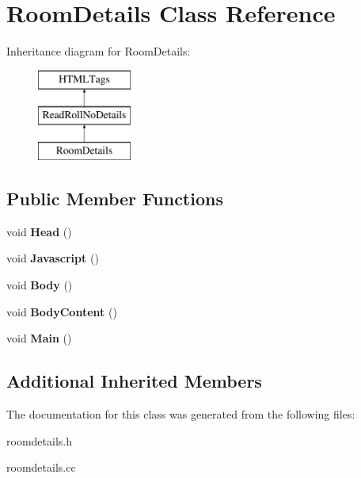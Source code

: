 \hypertarget{classRoomDetails}{\section{Room\-Details Class Reference}
\label{classRoomDetails}
}
Inheritance diagram for Room\-Details\-:\begin{figure}[H]
\begin{center}
\leavevmode
\includegraphics[height=3.000000cm]{classRoomDetails}
\end{center}
\end{figure}
\subsection*{Public Member Functions}
\begin{DoxyCompactItemize}
\item 
\hypertarget{classRoomDetails_a12c87132fd36826fe2af9dbdb0b78e95}{void {\bfseries Head} ()}\label{classRoomDetails_a12c87132fd36826fe2af9dbdb0b78e95}

\item 
\hypertarget{classRoomDetails_aa88baea324517582b52f0e414744ea5d}{void {\bfseries Javascript} ()}\label{classRoomDetails_aa88baea324517582b52f0e414744ea5d}

\item 
\hypertarget{classRoomDetails_ad75c50cee05130e464714649ad640fa5}{void {\bfseries Body} ()}\label{classRoomDetails_ad75c50cee05130e464714649ad640fa5}

\item 
\hypertarget{classRoomDetails_ab440cfe52056a93720c2f6d82622510f}{void {\bfseries Body\-Content} ()}\label{classRoomDetails_ab440cfe52056a93720c2f6d82622510f}

\item 
\hypertarget{classRoomDetails_a5d3f194992c2c13c77d0d07e7d7d5bcd}{void {\bfseries Main} ()}\label{classRoomDetails_a5d3f194992c2c13c77d0d07e7d7d5bcd}

\end{DoxyCompactItemize}
\subsection*{Additional Inherited Members}


The documentation for this class was generated from the following files\-:\begin{DoxyCompactItemize}
\item 
roomdetails.\-h\item 
roomdetails.\-cc\end{DoxyCompactItemize}
